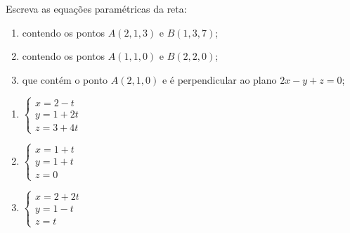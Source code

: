 \documentclass[12pt]{exam}
\begin{document}
\begin{exercicio}
    Escreva as equações paramétricas da reta:
    \begin{enumerate}[label=({\alph*})]
        \item contendo os pontos $A(2,1,3)$ e $B(1,3,7)$;
        \item contendo os pontos $A(1,1,0)$ e $B(2,2,0)$;
        \item que contém o ponto $A(2,1,0)$ e é perpendicular ao plano $2x - y + z = 0$;
    \end{enumerate}
    \begin{solucao}
        \begin{enumerate}[label=({\alph*})]
            \item $\begin{cases}
                          x = 2 - t  \\
                          y = 1 + 2t \\
                          z = 3 + 4t
                      \end{cases}$
            \item $\begin{cases}
                          x = 1 + t \\
                          y = 1 + t \\
                          z = 0
                      \end{cases}$
            \item $\begin{cases}
                          x = 2 + 2t \\
                          y = 1 - t  \\
                          z = t
                      \end{cases}$
        \end{enumerate}
    \end{solucao}
\end{exercicio}
\end{document}
